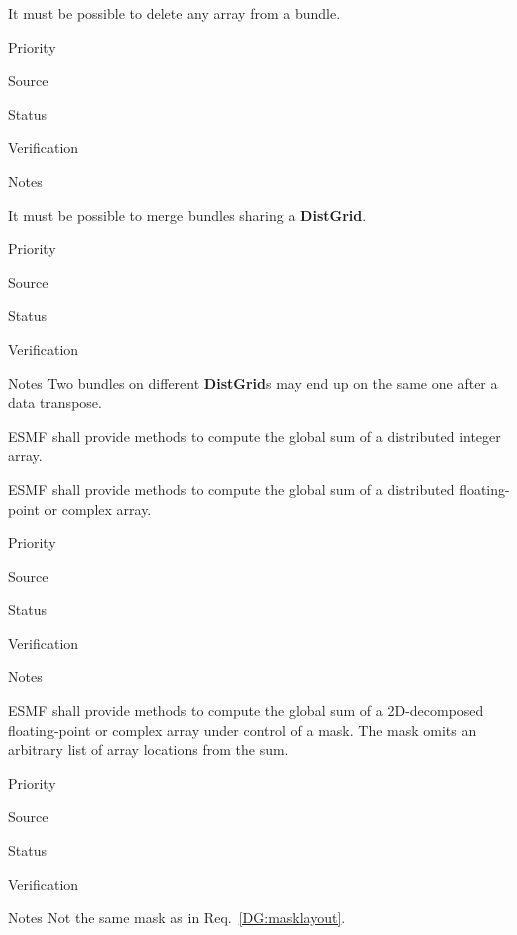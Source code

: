 
It must be possible to delete any array from a bundle.

\begin{reqlist}
\item[Priority]
\item[Source]
\item[Status]
\item[Verification]
\item[Notes]
\end{reqlist}


It must be possible to merge bundles sharing a \textbf{DistGrid}.

\begin{reqlist}
\item[Priority]
\item[Source]
\item[Status]
\item[Verification]
\item[Notes] Two bundles on different \textbf{DistGrid}s may end up on the same
  one after a data transpose.
\end{reqlist}



ESMF shall provide methods to compute the global sum of a distributed
integer array.


ESMF shall provide methods to compute the global sum of a distributed
floating-point or complex array.

\begin{reqlist}
\item[Priority]
\item[Source]
\item[Status]
\item[Verification]
\item[Notes]
\end{reqlist}

 \label{DG:masksum}

ESMF shall provide methods to compute the global sum of a 2D-decomposed
floating-point or complex array under control of a mask. The mask
omits an arbitrary list of array locations from the sum.

\begin{reqlist}
\item[Priority]
\item[Source]
\item[Status]
\item[Verification]
\item[Notes] Not the same mask as in Req.~\ref{DG:masklayout}.
\end{reqlist}

